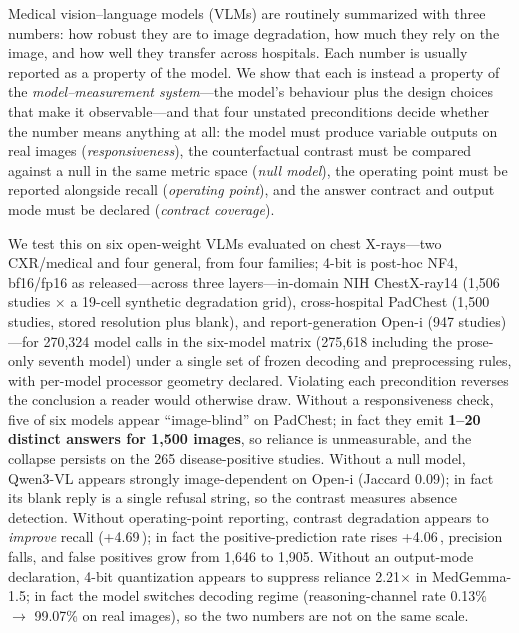 Medical vision--language models (VLMs) are routinely summarized with three numbers: how robust they are to image degradation, how much they rely on the image, and how well they transfer across hospitals. Each number is usually reported as a property of the model. We show that each is instead a property of the \emph{model--measurement system}---the model's behaviour plus the design choices that make it observable---and that four unstated preconditions decide whether the number means anything at all: the model must produce variable outputs on real images (\emph{responsiveness}), the counterfactual contrast must be compared against a null in the same metric space (\emph{null model}), the operating point must be reported alongside recall (\emph{operating point}), and the answer contract and output mode must be declared (\emph{contract coverage}).

We test this on six open-weight VLMs evaluated on chest X-rays---two CXR/medical and four general, from four families; 4-bit is post-hoc NF4, bf16/fp16 as released---across three layers---in-domain NIH ChestX-ray14 (1,506 studies $\times$ a 19-cell synthetic degradation grid), cross-hospital PadChest (1,500 studies, stored resolution plus blank), and report-generation Open-i (947 studies)---for 270,324 model calls in the six-model matrix (275,618 including the prose-only seventh model) under a single set of frozen decoding and preprocessing rules, with per-model processor geometry declared. Violating each precondition reverses the conclusion a reader would otherwise draw. Without a responsiveness check, five of six models appear ``image-blind'' on PadChest; in fact they emit \textbf{1--20 distinct answers for 1,500 images}, so reliance is unmeasurable, and the collapse persists on the 265 disease-positive studies. Without a null model, Qwen3-VL appears strongly image-dependent on Open-i (Jaccard 0.09); in fact its blank reply is a single refusal string, so the contrast measures absence detection. Without operating-point reporting, contrast degradation appears to \emph{improve} recall (+4.69\,\pp{}); in fact the positive-prediction rate rises +4.06\,\pp{}, precision falls, and false positives grow from 1,646 to 1,905. Without an output-mode declaration, 4-bit quantization appears to suppress reliance 2.21$\times$ in MedGemma-1.5; in fact the model switches decoding regime (reasoning-channel rate 0.13\% $\rightarrow$ 99.07\% on real images), so the two numbers are not on the same scale.

